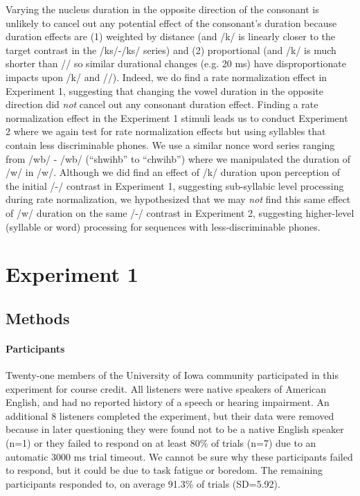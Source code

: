 \documentclass[preprint]{JASA}
\begin{document}
Varying the nucleus duration in the opposite direction of the consonant is unlikely to cancel out any potential effect of the consonant's duration because duration effects are (1) weighted by distance (and /k/ is linearly closer to the target contrast in the /\textesh k\textscripta s/-/\textteshlig k\textscripta s/ series) and (2) proportional (and /k/ is much shorter than /\textscripta/ so similar durational changes (e.g. 20 ms) have disproportionate impacts upon /k/ and /\textscripta/). Indeed, we do find a rate normalization effect in Experiment 1, suggesting that changing the vowel duration in the opposite direction did \textit{not} cancel out any consonant duration effect. Finding a rate normalization effect in the Experiment 1 stimuli leads us to conduct Experiment 2 where we again test for rate normalization effects but using syllables that contain less discriminable phones. We use a similar nonce word series ranging from /\textesh w\textsci b/ - /\textteshlig w\textsci b/ (``shwihb'' to ``chwihb'') where we manipulated the duration of /w/ in /w\textsci/. Although we did find an effect of /k/ duration upon perception of the initial /\textesh-\textteshlig/ contrast in Experiment 1, suggesting sub-syllabic level processing during rate normalization, we hypothesized that we may \textit{not} find this same effect of /w/ duration on the same /\textesh-\textteshlig/ contrast in Experiment 2, suggesting higher-level (syllable or word) processing for sequences with less-discriminable phones. 




\section{Experiment 1}\label{exp1}

\subsection{Methods}

\paragraph{Participants}

Twenty-one members of the University of Iowa community participated in this experiment for course credit. All listeners were native speakers of American English, and had no reported history of a speech or hearing impairment. An additional 8 listeners completed the experiment, but their data were removed because in later questioning they were found not to be a native English speaker (n=1) or they failed to respond on at least 80\% of trials (n=7) due to an automatic 3000 ms trial timeout. We cannot be sure why these participants failed to respond, but it could be due to task fatigue or boredom. The remaining participants responded to, on average 91.3\% of trials (SD=5.92). 
\end{document}
